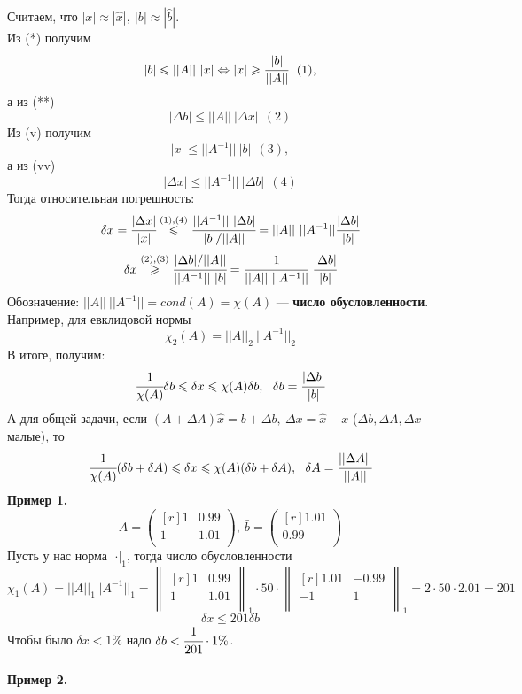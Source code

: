 \documentclass[12pt]{article}
\theoremstyle{definition}
\numberwithin{equation}{section}
\begin{document}
Считаем, что $|x|\approx |\hat x|,~ |b|\approx |\hat b|$.\\
Из (*) получим $$|b|\leqslant ||A||~|x| \Leftrightarrow |x| \geqslant \cfrac{|b|}{||A||}~~(1),$$а из (**) $$|\Delta b|\leqslant ||A||~|\Delta x|~~(2)$$
Из (v) получим $$|x|\leqslant ||A^{-1}||~|b|~~(3),$$ а из (vv) $$|\Delta x|\leqslant ||A^{-1}||~|\Delta b|~~(4)$$
Тогда относительная погрешность: $$\delta x=\cfrac{|\Delta x|}{|x|}\overset{(1), (4)}{\leqslant} \cfrac{||A^{-1}||~|\Delta b|}{|b|/||A||} = ||A||~||A^{-1}||\cfrac{|\Delta b|}{|b|}$$
$$\delta x \overset{(2), (3)}{\geqslant} \cfrac{|\Delta b|/||A||}{||A^{-1}||~|b|}=\cfrac{1}{||A||~||A^{-1}||}~\cfrac{|\Delta b|}{|b|}$$
Обозначение: $||A||~||A^{-1}|| = cond(A) = \chi (A) $ --- \textbf{число обусловленности}.\\
Например, для евклидовой нормы $$\chi_2(A)=||A||_2~||A^{-1}||_2$$
В итоге, получим: $$\cfrac{1}{\chi(A)}\delta b \leqslant \delta x\leqslant \chi(A) \delta b,~~\delta b=\cfrac{|\Delta b|}{|b|}$$
А для общей задачи, если $(A+\Delta A) \hat x =b+\Delta b,~ \Delta x=\hat x-x$ ($\Delta b, \Delta A, \Delta x$ --- малые), то
$$\cfrac{1}{\chi(A)}(\delta b+\delta A) \leqslant \delta x \leqslant \chi(A)(\delta b+\delta A),~~\delta A=\cfrac{||\Delta A||}{||A||}$$
\textbf{Пример 1.}\\
\[A=\begin{pmatrix}[r]
1 & 0.99 \\
1 & 1.01 \\
\end{pmatrix},~ \bar b=\begin{pmatrix}[r]
1.01 \\
0.99 \\
\end{pmatrix}\]
Пусть у нас норма $|\cdot|_1$, тогда число обусловленности 
\[\chi_1(A)=||A||_1||A^{-1}||_1=\begin{Vmatrix}[r]
1 & 0.99 \\
1 & 1.01 \\
\end{Vmatrix}_1 \cdot 50 \cdot \begin{Vmatrix}[r]
1.01 & -0.99 \\
-1 & 1 \\
\end{Vmatrix}_1 = 2\cdot 50 \cdot 2.01 = 201\]
$$\delta x \leqslant 201 \delta b$$
Чтобы было $\delta x <1\%$ надо $\delta b<\cfrac{1}{201}\cdot 1\%$.\\
\\
\textbf{Пример 2.}\\
\end{document}
